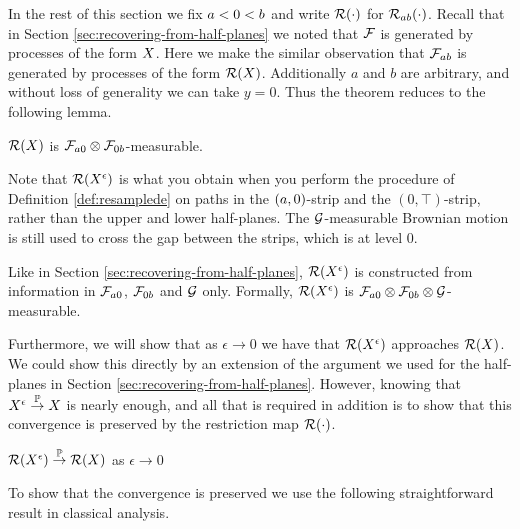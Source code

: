 {In the rest of this
section we fix $a < 0 < b$ and write $\mathcal{R}(\cdot)$ for
$\mathcal{R}_{{a}{b}}(\cdot)$.
Recall that in Section \ref{sec:recovering-from-half-planes} we noted that
$\mathcal{F}$ is generated by processes of the form $X$.  Here we
make the similar observation that
$\mathcal{F}_{a b}$ is generated by processes of the form $\mathcal{R}(X)$.
Additionally $a$ and $b$ are arbitrary, and without loss of generality
we can take $y=0$.  Thus
the theorem reduces to the following lemma.

\begin{lemma}
  $\mathcal{R}(X)$ is $\mathcal{F}_{a 0} \otimes
  \mathcal{F}_{0 b}$-measurable.
\end{lemma}

\newcommand{\Resresamplede}{\Res{\resamplede}}
\newcommand{\Ressampled}{\Res{\sampled}}

Note that $\Resresamplede$ is what you obtain when you perform the
procedure of Definition \ref{def:resamplede} on paths in the
$(a,0)$-strip and the $(0,\top)$-strip, rather than the upper and lower
half-planes.  The $\mathcal{G}$-measurable Brownian motion is still used to
cross the gap between the strips, which is at level $0$.

Like in Section \ref{sec:recovering-from-half-planes}, $\Resresamplede$
is constructed from information in $\mathcal{F}_{a 0}$,
$\mathcal{F}_{0 b}$ and $\mathcal{G}$ only.
Formally,
  $\mathcal{R}(X^{\epsilon})$ is $\mathcal{F}_{a 0} \otimes \mathcal{F}_{0 b}
  \otimes \mathcal{G}$-measurable.

Furthermore, we will show that as $\epsilon \to 0$ we have that
$\Resresamplede$ approaches $\Ressampled$.  We could show this
directly by an extension of the argument we used for the half-planes
in Section \ref{sec:recovering-from-half-planes}.  However, knowing that
$X^{\epsilon} \overset{\mathbb{P}}\to X$ is nearly enough, and all that is required
in addition is to show that this convergence is preserved by the
restriction map $\mathcal{R}(\cdot)$.

\begin{lemma}
    \label{lem:resamplede-to-sampled-strip}
    $\mathcal{R}(X^{\epsilon}) \overset{\mathbb{P}}\to \mathcal{R}(X)$ as $\epsilon \to 0$
\end{lemma}

To show that the convergence is preserved we use the following
straightforward result in classical analysis.

\newcommand{\stripleavetimenotturningpoint}[1]{$\stripleavetime{#1}$ is
  not a turning point of the path $#1$}

}
